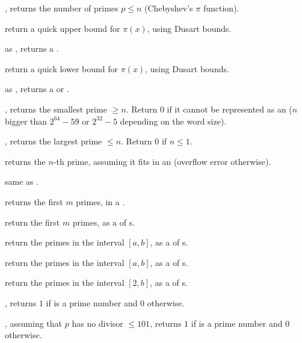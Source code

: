 

, returns the number of primes $p\leq n$
(Chebyshev's $\pi$ function).

 return a quick upper bound for
$\pi(x)$, using Dusart bounds.

 as , returns a
.

 return a quick lower bound for
$\pi(x)$, using Dusart bounds.

 as , returns
a  or .


, returns the smallest prime $\geq n$. Return
$0$ if it cannot be represented as an  ($n$ bigger than $2^{64} -
59$ or $2^{32} - 5$ depending on the word size).

, returns the largest prime $\leq n$. Return
$0$ if $n\leq 1$.

 returns the $n$-th prime, assuming it fits in an
 (overflow error otherwise).

 same as .

 returns the first $m$ primes, in a
.

 return the first $m$ primes, as a  of
s.

 return the primes in the interval
$[a,b]$, as a  of s.

 return the primes in the
interval $[a,b]$, as a  of s.

 return the primes in the interval $[2,b]$,
as a  of s.


, returns $1$ if  is a prime number and
$0$ otherwise.

, assuming that $p$ has no divisor $\leq
101$, returns $1$ if  is a prime number and $0$ otherwise.


